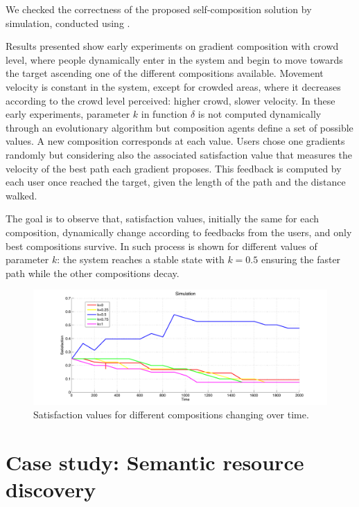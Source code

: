 \documentclass[12pt,a4paper,twoside,openright]{book}
\begin{document}
We checked the correctness of the proposed self-composition solution by simulation, conducted using \alchemist{}.

Results presented show early experiments on gradient composition with crowd level, where people dynamically enter in the system and begin to move towards the target ascending one of the different compositions available. Movement velocity is constant in the system, except for crowded areas, where it decreases according to the crowd level perceived: higher crowd, slower velocity.
%
In these early experiments, parameter $k$ in function $\delta$ is not computed dynamically through an evolutionary algorithm but composition agents define a set of possible values. A new composition corresponds at each value.
%
Users chose one gradients randomly but considering also the associated satisfaction value  that measures the velocity of the best path each gradient proposes. This feedback is computed by each user once reached the target, given the length of the path and the distance walked.

The goal is to observe that, satisfaction values, initially the same for each composition, dynamically change according to feedbacks from the users, and only best compositions survive. In  such process is shown for different values of parameter $k$: the system reaches a stable state with $k=0.5$ ensuring the faster path while the other compositions decay.

\begin{figure}
	\begin{center}
 		\includegraphics[width=\textwidth]{img/sc-simu.pdf}
\end{center}
\caption{Satisfaction values for different compositions changing over time.}
\label{fig:scsimu} 
\end{figure}

\chapter{Case study: Semantic resource discovery}
\end{document}
